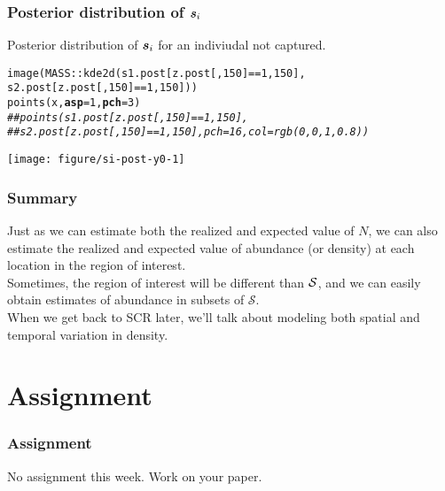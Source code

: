 \documentclass[color=usenames,dvipsnames]{beamer}\usepackage[]{graphicx}\usepackage[]{xcolor}
\makeatletter
\newcommand{\hlnum}[1]{\textcolor[rgb]{0.69,0.494,0}{#1}}%
\newcommand{\hlcom}[1]{\textcolor[rgb]{0.514,0.506,0.514}{\textit{#1}}}%
\newcommand{\hlopt}[1]{\textcolor[rgb]{0,0,0}{#1}}%
\newcommand{\hlstd}[1]{\textcolor[rgb]{0,0,0}{#1}}%
\newcommand{\hlkwc}[1]{\textcolor[rgb]{0,0,0}{\textbf{#1}}}%
\newcommand{\hlkwd}[1]{\textcolor[rgb]{0.004,0.004,0.506}{#1}}%
\newenvironment{kframe}{%
 \def\at@end@of@kframe{}%
 \ifinner\ifhmode%
  \def\at@end@of@kframe{\end{minipage}}%
  \begin{minipage}{\columnwidth}%
 \fi\fi%
 \def\FrameCommand##1{\hskip\@totalleftmargin \hskip-\fboxsep
 \colorbox{shadecolor}{##1}\hskip-\fboxsep
     \hskip-\linewidth \hskip-\@totalleftmargin \hskip\columnwidth}%
 \MakeFramed {\advance\hsize-\width
   \@totalleftmargin\z@ \linewidth\hsize
   \@setminipage}}%
 {\par\unskip\endMakeFramed%
 \at@end@of@kframe}
\newenvironment{knitrout}{}{} %
\makeatother
\begin{document}
\begin{frame}[fragile]
  \frametitle{Posterior distribution of ${\bm s}_i$}
  \small
  Posterior distribution of ${\bm s}_i$ for an indiviudal \alert{not}
  captured. 
\begin{knitrout}\scriptsize
{}\color{fgcolor}\begin{kframe}
\begin{alltt}
\hlkwd{image}\hlstd{(MASS}\hlopt{::}\hlkwd{kde2d}\hlstd{(s1.post[z.post[,}\hlnum{150}\hlstd{]}\hlopt{==}\hlnum{1}\hlstd{,}\hlnum{150}\hlstd{],}
                  \hlstd{s2.post[z.post[,}\hlnum{150}\hlstd{]}\hlopt{==}\hlnum{1}\hlstd{,}\hlnum{150}\hlstd{]))}
\hlkwd{points}\hlstd{(x,} \hlkwc{asp}\hlstd{=}\hlnum{1}\hlstd{,} \hlkwc{pch}\hlstd{=}\hlnum{3}\hlstd{)}
\hlcom{##points(s1.post[z.post[,150]==1,150],}
\hlcom{##       s2.post[z.post[,150]==1,150], pch=16, col=rgb(0,0,1,0.8))}
\end{alltt}
\end{kframe}
\end{knitrout}
\centering
\texttt{[image: figure/si-post-y0-1]} \\
\end{frame}





\begin{frame}
  \frametitle{Summary}
  Just as we can estimate both the realized and expected value of $N$,
  we can also estimate the realized and expected value of abundance
  (or density) at each location in the region of interest. \\
  \pause \vfill
  Sometimes, the region of interest will be different than
  $\cal S$, and we can easily obtain estimates of abundance in
  subsets of $\mathcal{S}$. \\
  \pause \vfill
  When we get back to SCR later, we'll talk about modeling both
  spatial and temporal variation in density.
\end{frame}




\section{Assignment}




\begin{frame}[fragile]
  \frametitle{Assignment}
  No assignment this week. Work on your paper. \\
\end{frame}
\end{document}
